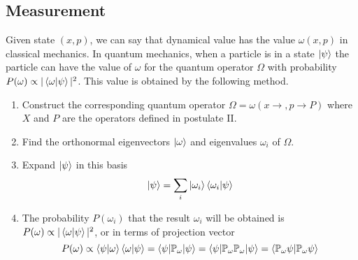 \documentclass[../../../main.tex]{subfiles}
\begin{document}
\subsection{Measurement}
Given state $(x,p)$, we can say that dynamical value has the value $\omega(x,p)$ in classical mechanics.
In quantum mechanics, when a particle is in a state $\ket{\psi } $ the particle can have the value of $\omega$ for the quantum operator $\Omega$ with probability $P(\omega)\propto|\braket{\omega|\psi}  |^2$. 
This value is obtained by the following method.
\begin{enumerate}
    \item Construct the corresponding quantum operator $\Omega=\omega(x \rightarrow ,p \rightarrow P)$ where $X$ and $P$ are the operators defined in postulate II.
    \item Find the orthonormal eigenvectors $\ket{\omega} $ and eigenvalues $\omega_i$ of $\Omega$.
    \item Expand $\ket{\psi } $ in this basis
    \begin{equation*}
        \ket{\psi }=\sum_i  \ket{\omega_i } \braket{\omega_i |\psi}  
    \end{equation*}
    \item The probability $P(\omega_i)$ that the result $\omega_i$ will be obtained is $P(\omega)\propto|\braket{\omega|\psi}  |^2$, or in terms of projection vector
    \begin{equation*}
        P(\omega)\propto \braket{\psi|\omega } \braket{\omega|\psi}=\braket{\psi|\mathbb{P}_\omega|\psi  }=\braket{\psi|\mathbb{P } _\omega \mathbb{P } _\omega |\psi   }=\braket{\mathbb{P } _\omega \psi| \mathbb{P } _\omega \psi  }    
    \end{equation*}
\end{enumerate}
\end{document}

